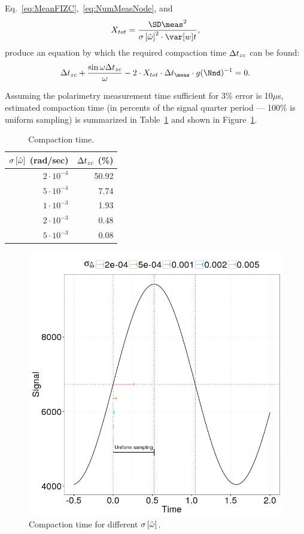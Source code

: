 \documentclass{article}
\newcommand{\dt}{\Delta t}
\newcommand{\dtm}{\dt_{\meas}}
\begin{document}
Eq.~\eqref{eq:MeanFIZC},~\eqref{eq:NumMeasNode}, and
\[
	\stat* = \stat,
\]
produce an equation by which the required compaction time $\dtnd$ can be found:
\begin{equation}\label{eq:CmpTEq}
	\dtnd + \frac{\sin\omega\dtnd}{\omega} - 2\cdot \stat* \cdot\dtm \cdot g(\Nnd)^{-1}= 0.
\end{equation}

Assuming the polarimetry measurement time sufficient for 3\% error is 10$\mu$s, estimated compaction time (in percents of the signal quarter period --- 100\% is uniform sampling) is summarized in Table~\ref{tbl:CmpTvsSEw} and shown in Figure~\ref{fig:CmpTvsSEw}.

\newcommand{\vp}[2]{{#1}\cdot 10^{#2}}
\begin{table}[h]
	\centering
	\caption{Compaction time.\label{tbl:CmpTvsSEw}}
	\begin{tabular}{rr}
		\hline
		$\SE{\hat{\omega}}$ (rad/sec) & $\dtnd$ (\%) \\ \hline
		$\vp{2}{-4}$ &        50.92 \\
		$\vp{5}{-4}$ &         7.74 \\
		$\vp{1}{-3}$ &         1.93 \\
		$\vp{2}{-3}$ &         0.48 \\
		$\vp{5}{-3}$ &         0.08 \\ \hline
	\end{tabular}
\end{table}

\begin{figure}[h]
	\centering
	\includegraphics[scale=.5]{img/StatReq/CmpTvsSEw}
	\caption{Compaction time for different $\SE{\hat{\omega}}$.\label{fig:CmpTvsSEw}}
\end{figure}
\end{document}
